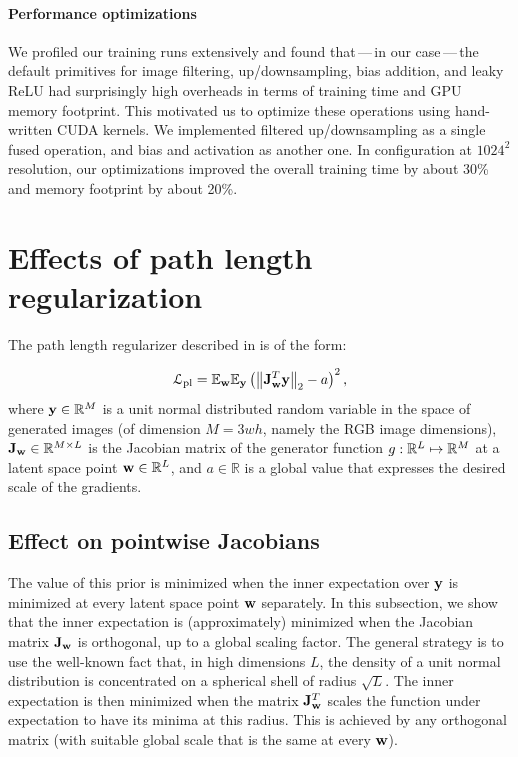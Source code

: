 \paragraph{Performance optimizations}
We profiled our training runs extensively and found that\,---\,in our case\,---\,the default primitives for image filtering, up/downsampling, bias addition, and leaky ReLU had surprisingly high overheads in terms of training time and GPU memory footprint.
This motivated us to optimize these operations using hand-written CUDA kernels.
We implemented filtered up/downsampling as a single fused operation, and bias and activation as another one.
In configuration  at $1024^2$ resolution, our optimizations improved the overall training time by about 30\% and memory footprint by about 20\%. %

\section{Effects of path length regularization}  %
\label{app:regularization}

The path length regularizer described in  is of the form:

\begin{equation}
	\mathcal{L}_{\mathrm{pl}} = \mathbb{E}_{\bf w} \mathbb{E}_{\bf y} \left(\left\lVert \mathbf{J}_{{\bf w}}^T {\bf y}\right\rVert_2 - a\right)^2,
	\label{eq:appxppl}
\end{equation}
where ${\bf y} \in \mathbb{R}^{M}$ is a unit normal distributed random variable in the space of generated images (of dimension $M = 3wh$, namely the RGB image dimensions), ${\bf J}_{\bf w} \in \mathbb{R}^{M \times L}$ is the Jacobian matrix of the generator function $g: \mathbb{R}^{L} \mapsto \mathbb{R}^{M}$ at a latent space point ${\bf w} \in \mathbb{R}^L$, and $a \in \mathbb{R}$ is a global value that expresses the desired scale of the gradients.

\subsection{Effect on pointwise Jacobians}
The value of this prior is minimized when the inner expectation over ${\bf y}$ is minimized at every latent space point ${\bf w}$ separately. In this subsection, we show that the inner expectation is (approximately) minimized when the Jacobian matrix ${\bf J}_{\bf w}$ is orthogonal, up to a global scaling factor. The general strategy is to use the well-known fact that, in high dimensions $L$, the density of a unit normal distribution is concentrated on a spherical shell of radius $\sqrt{L}$. The inner expectation is then minimized when the matrix ${\bf J}^T_{\bf w}$ scales the function under expectation to have its minima at this radius. This is achieved by any orthogonal matrix (with suitable global scale that is the same at every ${\bf w}$).

